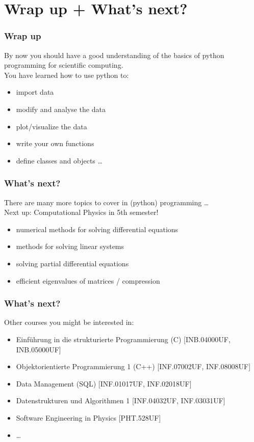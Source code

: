 \documentclass{beamer}
\begin{document}
\section{Wrap up + What's next?}
\begin{frame}
  \frametitle{Wrap up}
  By now you should have a good understanding of the basics of python programming for scientific computing.\\
  \vspace{5mm}
  You have learned how to use python to: 
  \begin{itemize}
    \item import data
    \item modify and analyse the data
    \item plot/visualize the data
    \item write your own functions
    \item define classes and objects \dots
  \end{itemize}
\end{frame}
\begin{frame}
  \frametitle{What's next?}
  There are many more topics to cover in (python) programming \dots\\
  \vspace{5mm}
  Next up: Computational Physics in 5th semester!\\
  \begin{itemize}
    \item numerical methods for solving differential equations
    \item methods for solving linear systems
    \item solving partial differential equations
    \item efficient eigenvalues of matrices / compression
  \end{itemize}
\end{frame}
\begin{frame}
  \frametitle{What's next?}
  Other courses you might be interested in:
  \begin{itemize}
    \item Einführung in die strukturierte Programmierung (C) [INB.04000UF, 
    INB.05000UF]
    \item Objektorientierte Programmierung 1 (C++) [INF.07002UF, INF.08008UF]
    \item Data Management (SQL) [INF.01017UF, INF.02018UF]
    \item Datenstrukturen und Algorithmen 1 [INF.04032UF, INF.03031UF]
    \item Software Engineering in Physics [PHT.528UF]
    \item \dots
  \end{itemize}
\end{frame}
\end{document}
